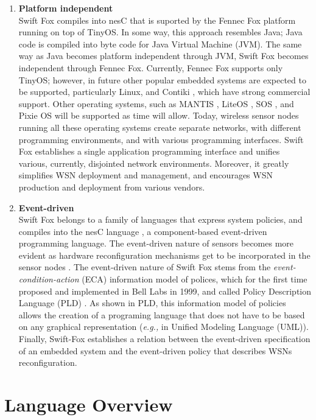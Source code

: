\begin{enumerate}
	\item \textbf{Platform independent}	\\
	Swift Fox compiles into nesC \cite{gay:2003} that is suported 
	by the Fennec Fox platform running on top of TinyOS. In some way,
	this approach resembles Java; Java code  is compiled into byte code
	for Java Virtual Machine (JVM). The same way as Java becomes
	platform independent through JVM, Swift Fox becomes independent
	through Fennec Fox. Currently, Fennec Fox supports only TinyOS;
	however, in future other popular embedded systems are expected to
	be supported, particularly Linux, and Contiki \cite{dunkels:2004a},
	which have strong commercial support. Other operating systems,
	such as MANTIS \cite{bhatti:2005}, LiteOS \cite{cao:2008}, SOS
	\cite{han:2005}, and Pixie OS \cite{lorincz:2008} will be supported
	as time will allow. Today, wireless sensor nodes running all these 
	operating systems create separate networks, with different
	programming environments, and with various programming interfaces.
	Swift Fox establishes a single application programming interface
	and unifies various, currently, disjointed network environments.
	Moreover, it greatly simplifies WSN deployment and management, and 
	encourages WSN production and deployment from various vendors.  

	\item \textbf{Event-driven}		\\
	Swift Fox belongs to a family of languages that express system
	policies, and compiles into the nesC language \cite{gay:2003}, a
	component-based event-driven programming language. The event-driven
	nature of sensors becomes more evident as hardware reconfiguration
	mechanisms get to be incorporated in the sensor nodes
	\cite{kateeb:2009}. The event-driven nature of Swift Fox stems from
	the \textit{event-condition-action} (ECA) information model of
	polices, which for the first time proposed and implemented in Bell 
	Labs in 1999, and called Policy Description Language (PLD)
	\cite{Lobo:1999:PDL:315149.315308}. As shown in PLD, this
	information model of policies allows the creation of a programing
	language that does not have to be based on any graphical
	representation (\textit{e.g.,} in Unified Modeling Language (UML)).
	Finally, Swift-Fox establishes a relation between the event-driven
	specification of an embedded system and the event-driven policy
	that describes WSNs reconfiguration.
\end{enumerate}


\section{Language Overview}

